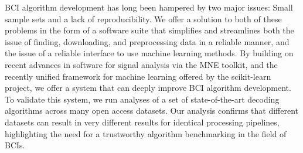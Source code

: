 BCI algorithm development has long been hampered by two major issues: Small
sample sets and a lack of reproducibility. We offer a solution to both of these
problems in the form of a software suite that simplifies and streamlines both
the issue of finding, downloading, and preprocessing data in a reliable manner,
and the issue of a reliable interface to use machine learning methods. By
building on recent advances in software for signal analysis via the MNE toolkit,
and the recently unified framework for machine learning offered by the scikit-learn
project, we offer a system that can deeply improve BCI algorithm
development. To validate this system, we run analyses of a set of state-of-the-art
decoding algorithms across many open access datasets. Our analysis confirms that
different datasets can result in very different results for identical processing
pipelines, highlighting the need for a trustworthy algorithm benchmarking in the field of BCIs.
